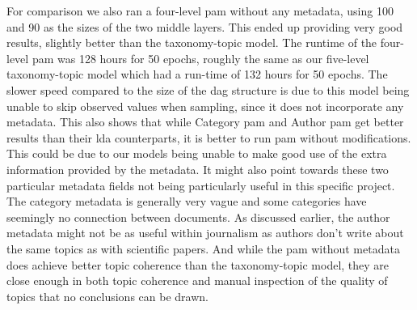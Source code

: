 For comparison we also ran a four-level \gls{pam} without any metadata, using 100 and 90 as the sizes of the two middle layers.
This ended up providing very good results, slightly better than the taxonomy-topic model.
The runtime of the four-level \gls{pam} was 128 hours for 50 epochs, roughly the same as our five-level taxonomy-topic model which had a run-time of 132 hours for 50 epochs.
The slower speed compared to the size of the \gls{dag} structure is due to this model being unable to skip observed values when sampling, since it does not incorporate any metadata.
This also shows that while Category \gls{pam} and Author \gls{pam} get better results than their \gls{lda} counterparts, it is better to run \gls{pam} without modifications.
This could be due to our models being unable to make good use of the extra information provided by the metadata.
It might also point towards these two particular metadata fields not being particularly useful in this specific project.
The category metadata is generally very vague and some categories have seemingly no connection between documents.
As discussed earlier, the author metadata might not be as useful within journalism as authors don't write about the same topics as with scientific papers.
And while the \gls{pam} without metadata does achieve better topic coherence than the taxonomy-topic model, they are close enough in both topic coherence and manual inspection of the quality of topics that no conclusions can be drawn.
